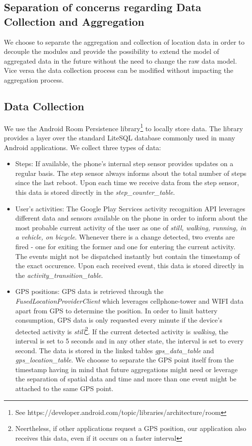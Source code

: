 \subsection{Separation of concerns regarding Data Collection and Aggregation}
We choose to separate the aggregation and collection of location data in order to decouple the modules and provide the possibility to extend the model of aggregated data in the future without the need to change the raw data model. Vice versa the data collection process can be modified without impacting the aggregation process.

\subsection {Data Collection}
We use the Android Room Persistence library\footnote{See https://developer.android.com/topic/libraries/architecture/room} to locally store data. The library provides a layer over the standard LiteSQL database commonly used in many Android applications. We collect three types of data:
\begin{itemize}
	\item Steps: If available, the phone's internal step sensor provides updates on a regular basis. The step sensor always informs about the total number of steps since the last reboot. Upon each time we receive data from the step sensor, this data is stored directly in the \textit{step\_counter\_table}.
	\item User's activities: The Google Play Services  activity recognition API leverages different data and sensors available on the phone in order to inform about the most probable current activity of the user as one of \textit{still, walking, running, in a vehicle, on bicycle}. Whenever there is a change detected, two events are fired - one for exiting the former and one for entering the current activity. The events might not be dispatched instantly but contain the timestamp of the exact occurence. Upon each received event, this data is stored directly in the \textit{activity\_transition\_table}.
	\item GPS positions: GPS data is retrieved through the \textit{FusedLocationProviderClient} which leverages cellphone-tower and WIFI data apart from GPS to determine the position. In order to limit battery consumption, GPS data is only requested every minute if the device's detected activity is \textit{still}\footnote{Neertheless, if other applications request a GPS position, our application also receives this data, even if it occurs on a faster interval}. If the current detected activity is \textit{walking}, the interval is set to 5 seconds and in any other state, the interval is set to every second. The data is stored in the linked tables \textit{gps\_data\_table} and \textit{gps\_location\_table}. We choosse to separate the GPS point itself from the timestamp having in mind that future aggregations might need or leverage the separation of spatial data and time and more than one event might be attached to the same GPS point.
\end{itemize}

